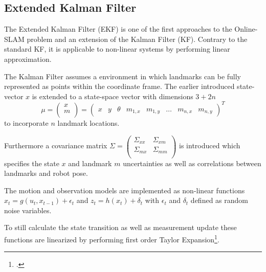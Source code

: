\subsection{Extended Kalman Filter}
\label{sec:ExtendedKalmanFilter}
The Extended Kalman Filter (EKF) is one of the first approaches to the Online-SLAM problem and an extension of the Kalman Filter (KF). Contrary to the standard KF, it is applicable to non-linear systems by performing linear approximation.


The Kalman Filter assumes a environment in which landmarks can be fully represented as points within the coordinate frame. The earlier introduced state-vector $ x $ is extended to a state-space vector with dimensions $ 3 + 2n$
\[ \mu = 
\begin{pmatrix}
	x \\
	m \\
\end{pmatrix}
=
\begin{pmatrix}
	x & y & \theta & m_{1, x} & m_{1, y} & \dots & m_{n, x} & m_{n, y} 
\end{pmatrix} ^{T}
\] 
to incorporate $n$ landmark locations. 

Furthermore a covariance matrix 
$ \Sigma = 
\begin{pmatrix}
	\Sigma_{xx} & \Sigma_{xm} \\
	\Sigma_{mx} & \Sigma_{mm} \\
\end{pmatrix} $ 
is introduced which specifies the state $ x $ and landmark $ m $ uncertainties as well as correlations between landmarks and robot pose. 

The motion and observation models are implemented as non-linear functions $x_{t} = g(u_{t}, x_{t - 1}) + \epsilon_{t}$ and $z_{t} = h(x_{t}) + \delta_{t}$ with $\epsilon_{t}$ and $\delta_{t}$ defined as random noise variables.%

To still calculate the state transition as well as measurement update these functions are linearized by performing first order Taylor Expansion\footcite[Pages 33-51]{thrun2002probabilisticRobotics}.

